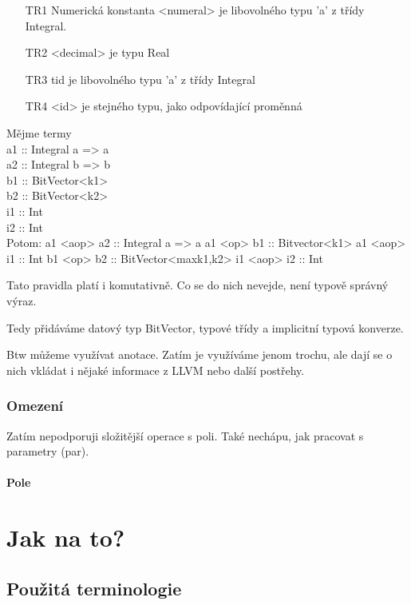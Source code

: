 \documentclass[10pt,a4paper,notitlepage]{report}
\begin{document}
\begin{enumerate}
\item[TR1] Numerická konstanta <numeral> je libovolného typu 'a' z třídy Integral.
\item[TR2] <decimal> je typu Real
\item[TR3] tid je libovolného typu 'a' z třídy Integral
\item[TR4] <id> je stejného typu, jako odpovídající proměnná
\end{enumerate}


Mějme termy\\
a1 :: Integral a => a\\
a2 :: Integral b => b\\
b1 :: BitVector<k1> \\
b2 :: BitVector<k2>\\
i1 :: Int\\
i2 :: Int\\

Potom:
a1 <aop> a2 :: Integral a => a
a1 <op>  b1 :: Bitvector<k1>
a1 <aop> i1 :: Int
b1 <op>  b2 :: BitVector<max{k1,k2}>
i1 <aop> i2 :: Int

Tato pravidla platí i komutativně. Co se do nich nevejde, není typově správný výraz.

Tedy přidáváme datový typ BitVector, typové třídy a implicitní typová konverze.

Btw můžeme využívat anotace. Zatím je využíváme jenom trochu, ale dají se o nich vkládat
i nějaké informace z LLVM nebo další postřehy.

\subsection{Omezení}
Zatím nepodporuji složitější operace s poli. Také nechápu, jak pracovat s parametry (par).

\subsubsection{Pole}

\chapter{Jak na to?}

\section{Použitá terminologie}
\end{document}
